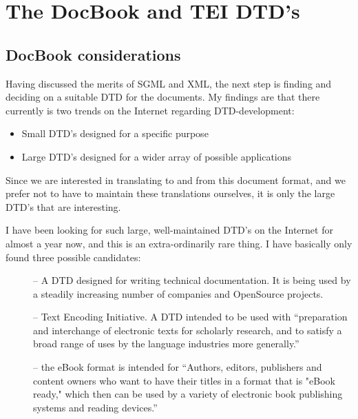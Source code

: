 
\chapter{The DocBook and TEI DTD's}

\section{DocBook considerations}
\label{sec:docbook}

Having discussed the merits of SGML and XML, the next step is finding
and deciding on a suitable DTD for the documents.  My findings are
that there currently is two trends on the Internet regarding
DTD-development:

\begin{itemize}
\item Small DTD's designed for a specific purpose
\item Large DTD's designed for a wider array of possible applications
\end{itemize}

Since we are interested in translating to and from this document
format, and we prefer not to have to maintain these translations
ourselves, it is only the large DTD's that are interesting.

I have been looking for such large, well-maintained DTD's on the
Internet for almost a year now, and this is an extra-ordinarily rare
thing.  I have basically only found three possible candidates:

\begin{description}
\item[] -- A DTD designed for
writing technical documentation.  It is being used by a steadily
increasing number of companies and OpenSource projects.


\item[] -- Text Encoding
  Initiative.  A DTD intended to be used with ``preparation and interchange of electronic texts for scholarly research, and to satisfy a broad range of
uses by the language industries more generally.''

\item[] -- the eBook
  format is intended for ``Authors, editors, publishers and content
  owners who want to have their titles in a format that is "eBook
  ready," which then can be used by a variety of electronic book
  publishing systems and reading devices.''
\end{description}

